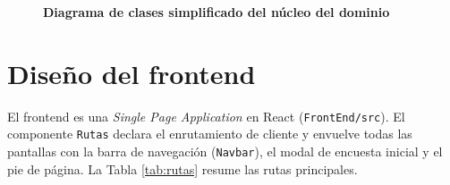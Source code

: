 \begin{figure}[H]
{}
  \caption{\textbf{Diagrama de clases simplificado del núcleo del dominio}}
  \label{DiagramaClases}
\end{figure}

\section{Diseño del frontend}
El frontend es una \textit{Single Page Application} en React (\texttt{FrontEnd/src}). El componente \texttt{Rutas} declara el enrutamiento de cliente y envuelve todas las pantallas con la barra de navegación (\texttt{Navbar}), el modal de encuesta inicial y el pie de página. La Tabla \ref{tab:rutas} resume las rutas principales.

